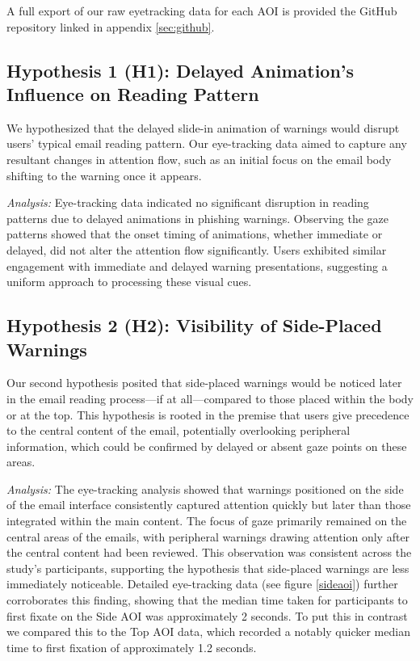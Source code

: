 \documentclass[
  a4paper,  %
  twoside,  %
  bibliography=totoc,
  headsepline,
  cleardoublepage=empty,
  parskip=half,
  draft=false
]{scrbook}
\begin{document}
A full export of our raw eyetracking data for each AOI is provided the GitHub repository linked in appendix \ref{sec:github}.


\subsection{Hypothesis 1 (H1): Delayed Animation's Influence on Reading Pattern}
We hypothesized that the delayed slide-in animation of warnings would disrupt users' typical email reading pattern. Our eye-tracking data aimed to capture any resultant changes in attention flow, such as an initial focus on the email body shifting to the warning once it appears. \par
\textit{Analysis:} Eye-tracking data indicated no significant disruption in reading patterns due to delayed animations in phishing warnings. Observing the gaze patterns showed that the onset timing of animations, whether immediate or delayed, did not alter the attention flow significantly. Users exhibited similar engagement with immediate and delayed warning presentations, suggesting a uniform approach to processing these visual cues.

\subsection{Hypothesis 2 (H2): Visibility of Side-Placed Warnings} 
Our second hypothesis posited that side-placed warnings would be noticed later in the email reading process—if at all—compared to those placed within the body or at the top. This hypothesis is rooted in the premise that users give precedence to the central content of the email, potentially overlooking peripheral information, which could be confirmed by delayed or absent gaze points on these areas. \par
\textit{Analysis:} The eye-tracking analysis showed that warnings positioned on the side of the email interface consistently captured attention quickly but later than those integrated within the main content. The focus of gaze primarily remained on the central areas of the emails, with peripheral warnings drawing attention only after the central content had been reviewed. This observation was consistent across the study's participants, supporting the hypothesis that side-placed warnings are less immediately noticeable. \newline Detailed eye-tracking data (see figure \ref{sideaoi}) further corroborates this finding, showing that the median time taken for participants to first fixate on the Side AOI was approximately 2 seconds. To put this in contrast we compared this to the Top AOI data, which recorded a notably quicker median time to first fixation of approximately 1.2 seconds.  
\end{document}
